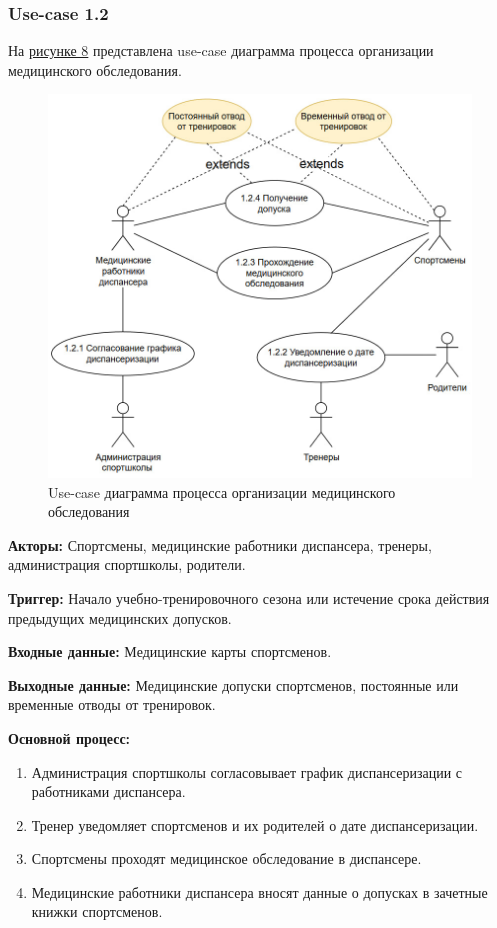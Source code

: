 \documentclass[12pt,a4paper,final]{article} %
\begin{document}
\subsubsection{Use-case 1.2}
\par На \hyperref[fig:im8]{рисунке 8} представлена use-case диаграмма процесса организации медицинского обследования. 
\begin{figure}[h!]
	\hspace{- 2cm} 
	\centering
	\includegraphics[width=1.1\linewidth]{images/5}
	\caption{Use-case диаграмма процесса организации медицинского обследования}
	\label{fig:im8}
\end{figure}	

\par \textbf{Акторы:} Спортсмены, медицинские работники диспансера, тренеры, администрация спортшколы, родители.
\par \textbf{Триггер:} Начало учебно-тренировочного сезона или истечение срока действия предыдущих медицинских допусков.
\par \textbf{Входные данные:} Медицинские карты спортсменов.
\par \textbf{Выходные данные:} Медицинские допуски спортсменов, постоянные или временные отводы от тренировок.

\par \textbf{Основной процесс:}
\begin{enumerate}[nosep, label=1.2.\arabic*]  
	\item Администрация спортшколы согласовывает график диспансеризации с работниками диспансера.
	\item Тренер уведомляет спортсменов и их родителей о дате диспансеризации.
	\item Спортсмены проходят медицинское обследование в диспансере.
	\item Медицинские работники диспансера вносят данные о допусках в зачетные книжки спортсменов.
\end{enumerate}
\end{document}

